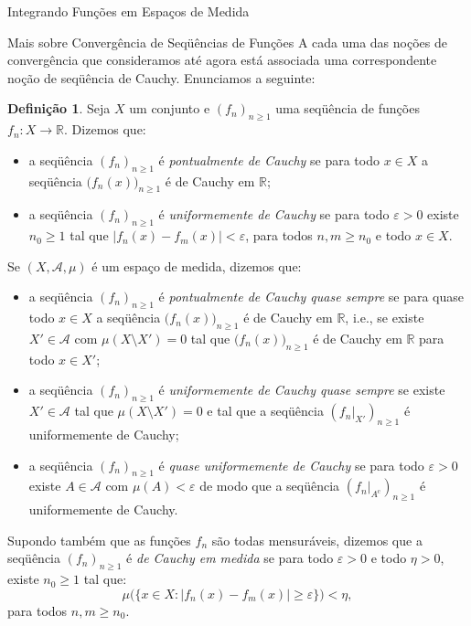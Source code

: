 \documentclass[oneside,final,11pt]{amsbook}
\newcommand{\R}{\mathds R}
\newcommand{\compl}{\mathrm c}
\theoremstyle{remark}\newtheorem{exercise}{Exercício}[chapter]
\theoremstyle{remark}\newtheorem{*exercise}[exercise]{\hbox to 0pt{\hskip 0pt minus 1fil*}Exercício}
\theoremstyle{definition}\newtheorem{exdefin}{Definição}[chapter]
\theoremstyle{plain}\newtheorem{teo}{Teorema}[section]
\theoremstyle{plain}\newtheorem{lem}[teo]{Lema}
\theoremstyle{plain}\newtheorem{prop}[teo]{Proposição}
\theoremstyle{plain}\newtheorem{cor}[teo]{Corolário}
\theoremstyle{definition}\newtheorem{defin}[teo]{Definição}
\theoremstyle{remark}\newtheorem{rem}[teo]{Observação}
\theoremstyle{definition}\newtheorem{notation}[teo]{Notação}
\theoremstyle{definition}\newtheorem{convention}[teo]{Convenção}
\theoremstyle{definition}\newtheorem{example}[teo]{Exemplo}
\numberwithin{section}{chapter}
\numberwithin{equation}{section}
\begin{document}
\begin{chapter}{Integrando Funções em Espaços de Medida}
\begin{section}{Mais sobre Convergência de Seqüências de Funções}
A cada uma das noções de convergência que consideramos até agora está associada uma correspondente noção de seqüência
de Cauchy. Enunciamos a seguinte:
\begin{defin}
Seja $X$ um conjunto e $(f_n)_{n\ge1}$ uma seqüência de funções $f_n:X\to\R$. Dizemos que:
\begin{itemize}
\item a seqüência $(f_n)_{n\ge1}$ é {\em pontualmente de Cauchy\/}
se para todo $x\in X$ a seqüência $\big(f_n(x)\big)_{n\ge1}$ é de Cauchy em $\R$;
\item a seqüência $(f_n)_{n\ge1}$ é {\em uniformemente de Cauchy\/}
se para todo $\varepsilon>0$ existe $n_0\ge1$
tal que $\vert f_n(x)-f_m(x)\vert<\varepsilon$, para todos $n,m\ge n_0$ e todo $x\in X$.
\end{itemize}
Se $(X,\mathcal A,\mu)$ é um espaço de medida, dizemos que:
\begin{itemize}
\item a seqüência $(f_n)_{n\ge1}$ é {\em pontualmente de Cauchy quase sempre\/}
se para quase todo $x\in X$ a seqüência
$\big(f_n(x)\big)_{n\ge1}$ é de Cauchy em $\R$, i.e., se existe $X'\in\mathcal A$ com $\mu(X\setminus X')=0$ tal que
$\big(f_n(x)\big)_{n\ge1}$ é de Cauchy em $\R$ para todo $x\in X'$;
\item a seqüência $(f_n)_{n\ge1}$ é {\em uniformemente de Cauchy quase sempre\/}
se existe $X'\in\mathcal A$ tal que
$\mu(X\setminus X')=0$ e tal que a seqüência $(f_n\vert_{X'})_{n\ge1}$ é uniformemente de Cauchy;
\item a seqüência $(f_n)_{n\ge1}$ é {\em quase uniformemente de Cauchy\/}
se para todo $\varepsilon>0$ existe
$A\in\mathcal A$ com $\mu(A)<\varepsilon$ de modo que a seqüência $(f_n\vert_{A^\compl})_{n\ge1}$ é uniformemente
de Cauchy.
\end{itemize}
Supondo também que as funções $f_n$ são todas mensuráveis, dizemos que a seqüência $(f_n)_{n\ge1}$ é
{\em de Cauchy em medida\/}
se para todo $\varepsilon>0$ e todo $\eta>0$, existe $n_0\ge1$ tal que:
\[\mu\Big(\big\{x\in X:\big\vert f_n(x)-f_m(x)\big\vert\ge\varepsilon\big\}\Big)<\eta,\]
para todos $n,m\ge n_0$.
\end{defin}

\end{section}
\end{chapter}
\end{document}
